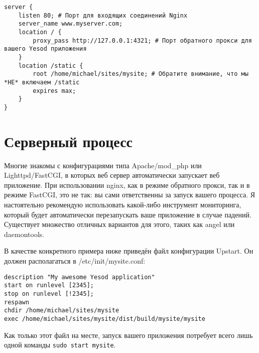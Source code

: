 \begin{lstlisting}
server {
    listen 80; # Порт для входящих соединений Nginx
    server_name www.myserver.com;
    location / {
        proxy_pass http://127.0.0.1:4321; # Порт обратного прокси для вашего Yesod приложения
    }
    location /static {
        root /home/michael/sites/mysite; # Обратите внимание, что мы *НЕ* включаем /static
        expires max;
    }
}
\end{lstlisting}
%

\section{Серверный процесс}

%
%
Многие знакомы с конфигурациями типа Apache/mod\_php или Lighttpd/FastCGI, в которых веб сервер автоматически запускает веб приложение. При использовании nginx, как в режиме обратного прокси, так и в режиме FastCGI, это не так: вы сами ответственны за запуск вашего процесса. Я настоятельно рекомендую использовать какой-либо инструмент мониторинга, который будет автоматически перезапускать ваше приложение в случае падений. Существует множество отличных вариантов для этого, таких как angel или daemontools.

В качестве конкретного примера ниже приведён файл конфигурации Upstart. Он должен располагаться в /etc/init/mysite.conf:

\begin{lstlisting}
description "My awesome Yesod application"
start on runlevel [2345];
stop on runlevel [!2345];
respawn
chdir /home/michael/sites/mysite
exec /home/michael/sites/mysite/dist/build/mysite/mysite
\end{lstlisting}
%

Как только этот файл на месте, запуск вашего приложения потребует всего лишь одной команды \lstinline{sudo start mysite}.
%
